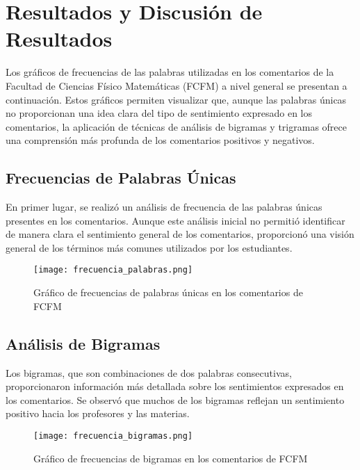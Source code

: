 \documentclass[a4paper,12pt]{article}
\begin{document}
\section{Resultados y Discusión de Resultados}

Los gráficos de frecuencias de las palabras utilizadas en los comentarios de la Facultad de Ciencias Físico Matemáticas (FCFM) a nivel general se presentan a continuación. Estos gráficos permiten visualizar que, aunque las palabras únicas no proporcionan una idea clara del tipo de sentimiento expresado en los comentarios, la aplicación de técnicas de análisis de bigramas y trigramas ofrece una comprensión más profunda de los comentarios positivos y negativos.

\subsection{Frecuencias de Palabras Únicas}

En primer lugar, se realizó un análisis de frecuencia de las palabras únicas presentes en los comentarios. Aunque este análisis inicial no permitió identificar de manera clara el sentimiento general de los comentarios, proporcionó una visión general de los términos más comunes utilizados por los estudiantes. 

\begin{figure}[h!]
    \centering
    \texttt{[image: frecuencia\_palabras.png]}
    \caption{Gráfico de frecuencias de palabras únicas en los comentarios de FCFM}
    \label{fig:frecuencia_palabras_unicas}
\end{figure}

\subsection{Análisis de Bigramas}

 Los bigramas, que son combinaciones de dos palabras consecutivas, proporcionaron información más detallada sobre los sentimientos expresados en los comentarios. Se observó que muchos de los bigramas reflejan un sentimiento positivo hacia los profesores y las materias.

\begin{figure}[h!]
    \centering
    \texttt{[image: frecuencia\_bigramas.png]}
    \caption{Gráfico de frecuencias de bigramas en los comentarios de FCFM}
    \label{fig:frecuencia_bigramas}
\end{figure}
\end{document}
